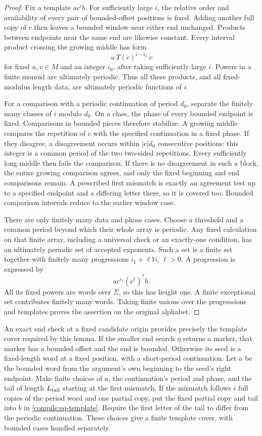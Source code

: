 \begin{proof}
Fix a template $ac^ib$. For sufficiently large $i$, the relative order
and availability of every pair of bounded-offset positions is fixed.
Adding another full copy of $c$ then leaves a bounded window near either
end unchanged. Products between endpoints near the same end are likewise
constant. Every interval product crossing the growing middle has form
\[
                       u\,T(c)^{i-i_0}\,v
\]
for fixed $u,v\in M$ and an integer $i_0$, after taking sufficiently
large $i$. Powers in a finite monoid are ultimately periodic. Thus all
these products, and all fixed-modulus length data, are ultimately
periodic functions of $i$.

For a comparison with a periodic continuation of period $d_0$, separate
the finitely many classes of $i$ modulo $d_0$. On a class, the phase of
every bounded endpoint is fixed. Comparisons in bounded pieces therefore
stabilize. A growing middle compares the repetition of $c$ with the
specified continuation in a fixed phase. If they disagree, a disagreement
occurs within $|c|d_0$ consecutive positions: this integer is a common
period of the two two-sided repetitions. Every sufficiently long middle
then fails the comparison. If there is no disagreement in such a block,
the entire growing comparison agrees, and only the fixed beginning and
end comparisons remain. A prescribed first mismatch is exactly an
agreement test up to a specified endpoint and a differing letter there,
so it is covered too. Bounded comparison intervals reduce to the earlier
window case.

There are only finitely many data and phase cases. Choose a threshold
and a common period beyond which their whole array is periodic. Any
fixed calculation on that finite array, including a universal check or
an exactly-one condition, has an ultimately periodic set of accepted
exponents. Such a set is a finite set together with finitely many
progressions $i_1+\ell\mathbb N$, $\ell>0$. A progression is expressed by
\[
                       ac^{i_1}(c^\ell)^*b.
\]
All its fixed powers are words over $\Sigma$, so this has height one.
A finite exceptional set contributes finitely many words. Taking finite
unions over the progressions and templates proves the assertion on the
original alphabet.
\end{proof}

An exact end check at a fixed candidate origin provides precisely the
template cover required by this lemma. If the smaller end search $\eta$
returns a marker, that marker has a bounded offset and the end is bounded.
Otherwise its seed is a fixed-length word at a fixed position, with a
short-period continuation. Let $a$ be the bounded word from the argument's
own beginning to the seed's right endpoint. Make finite choices of $a$,
the continuation's period and phase, and the tail of length
$L_{\rm tail}$ starting at the first mismatch. If the mismatch follows
$i$ full copies of the period word and one partial copy, put the fixed
partial copy and tail into $b$ in \eqref{compile:eq-template}. Require the
first letter of the tail to differ from the periodic continuation. These
choices give a finite template cover, with bounded cases handled separately.

